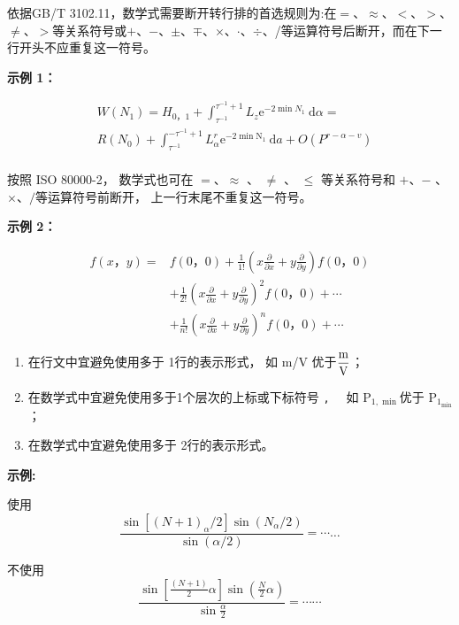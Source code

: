 依据GB/T 3102.11，数学式需要断开转行排的首选规则为:在$=$、$\approx$、$<$、$>$、$\ne$、$>$等关系符号或$+$、$-$、$\pm$、$\mp$、$\times$、$\cdot$、$\div$、/等运算符号后断开，而在下一行开头不应重复这一符号。


\textbf{\heiti 示例 1：}

\begin{align*}
&W\left(N_{1}\right)=H_{0， 1}+\int_{\tau^{-1}}^{\tau^{-1}+1} L_{z} \mathrm{e}^{-2 \min N_{1}} \mathrm{~d} \alpha= \\
&R\left(N_{0}\right)+\int_{\tau^{-1}}^{-\tau^{-1}+1} L_{\alpha}^{r} \mathrm{e}^{-2 \min \mathrm{N}_{1}} \mathrm{~d} a+O\left(P^{r-\alpha-v}\right) \\
\end{align*}


按照 ISO 80000-2，  数学式也可在  $=$、$ \approx$ 、 $\neq$ 、 $\leqslant$  等关系符号和  $+$、$-$ 、$\times$、$/$等运算符号前断开， 上一行末尾不重复这一符号。


\textbf{\heiti 示例 2：}

\begin{align*}
f(x，  y)= & f(0， 0)+\frac{1}{1 !}\left(x \frac{\partial}{\partial x}+y \frac{\partial}{\partial y}\right) f(0， 0) \\
& +\frac{1}{2 !}\left(x \frac{\partial}{\partial x}+y \frac{\partial}{\partial y}\right)^{2} f(0， 0)+\cdots \\
& +\frac{1}{n !}\left(x \frac{\partial}{\partial x}+y \frac{\partial}{\partial y}\right)^{n} f(0， 0)+\cdots
\end{align*}

\begin{enumerate}
\item  在行文中宜避免使用多于 1行的表示形式， 如 m/V 优于$\dfrac{\rm m}{\rm V}$；

\item  在数学式中宜避免使用多于1个层次的上标或下标符号 \verb|,  | 如 P${}_{1, \min{}}$优于 P${}_{1_{\min{}}}$；

\item  在数学式中宜避免使用多于 2行的表示形式。
\end{enumerate}

\textbf{\heiti 示例:}

使用
\[
\frac{\sin \left[(N+1)_{\alpha} / 2\right] \sin \left(N_{\alpha} / 2\right)}{\sin (\alpha / 2)}=\cdots \ldots
\]

不使用
\[
\frac{\sin \left[\frac{(N+1)}{2} \alpha\right] \sin \left(\frac{N}{2} \alpha\right)}{\sin \frac{\alpha}{2}}=\cdots \cdots
\]

